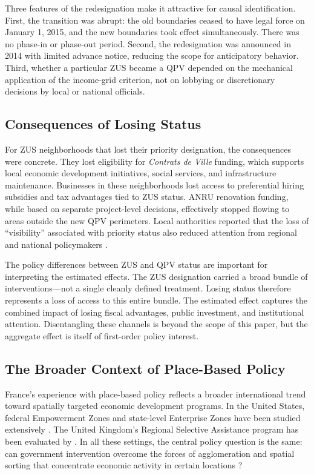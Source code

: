 \documentclass[12pt]{article}
\begin{document}
Three features of the redesignation make it attractive for causal identification. First, the transition was abrupt: the old boundaries ceased to have legal force on January 1, 2015, and the new boundaries took effect simultaneously. There was no phase-in or phase-out period. Second, the redesignation was announced in 2014 with limited advance notice, reducing the scope for anticipatory behavior. Third, whether a particular ZUS became a QPV depended on the mechanical application of the income-grid criterion, not on lobbying or discretionary decisions by local or national officials.

\subsection{Consequences of Losing Status}

For ZUS neighborhoods that lost their priority designation, the consequences were concrete. They lost eligibility for \textit{Contrats de Ville} funding, which supports local economic development initiatives, social services, and infrastructure maintenance. Businesses in these neighborhoods lost access to preferential hiring subsidies and tax advantages tied to ZUS status. ANRU renovation funding, while based on separate project-level decisions, effectively stopped flowing to areas outside the new QPV perimeters. Local authorities reported that the loss of ``visibility'' associated with priority status also reduced attention from regional and national policymakers \citep{onpv2020rapport}.

The policy differences between ZUS and QPV status are important for interpreting the estimated effects. The ZUS designation carried a broad bundle of interventions---not a single cleanly defined treatment. Losing status therefore represents a loss of access to this entire bundle. The estimated effect captures the combined impact of losing fiscal advantages, public investment, and institutional attention. Disentangling these channels is beyond the scope of this paper, but the aggregate effect is itself of first-order policy interest.

\subsection{The Broader Context of Place-Based Policy}

France's experience with place-based policy reflects a broader international trend toward spatially targeted economic development programs. In the United States, federal Empowerment Zones and state-level Enterprise Zones have been studied extensively \citep{busso2013assessing, neumark2015enterprise, ham2011government}. The United Kingdom's Regional Selective Assistance program has been evaluated by \citet{criscuolo2019some}. In all these settings, the central policy question is the same: can government intervention overcome the forces of agglomeration and spatial sorting that concentrate economic activity in certain locations \citep{kline2013place, duranton2004micro}?
\end{document}
